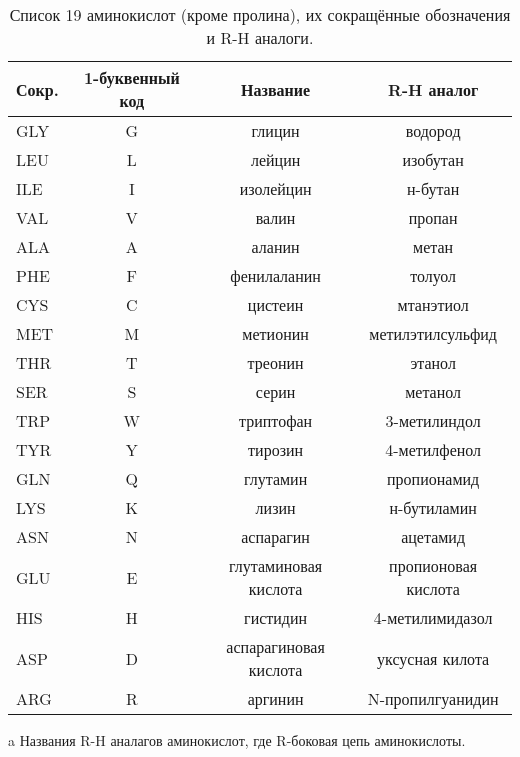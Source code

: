 \begin{table}
\caption{\label{tab:amino_codes} Список 19 аминокислот (кроме пролина), их сокращённые обозначения и R-H аналоги.}
\begin{threeparttable}
	\begin{tabular}{lccc}
Сокр. & 1-буквенный код &Название& R-H аналог\tnote{a} \\
	\hline
GLY &G&глицин& водород  				\\
LEU &L&лейцин& изобутан 				\\
ILE &I&изолейцин& н-бутан 			\\
VAL &V&валин& пропан       \\
ALA &A&аланин& метан           \\
PHE &F&фенилаланин& толуол     \\
CYS &C&цистеин& мтанэтиол      \\
MET &M&метионин& метилэтилсульфид\\
THR &T&треонин& этанол		\\
SER &S&серин& метанол		  \\
TRP &W&триптофан& 3-метилиндол \\
TYR &Y&тирозин& 4-метилфенол   \\
GLN &Q&глутамин& пропионамид    \\
LYS &K&лизин& н-бутиламин  \\
ASN &N&аспарагин& ацетамид      \\
GLU &E&глутаминовая кислота& пропионовая кислота  \\
HIS &H&гистидин& 4-метилимидазол  \\
ASP &D&аспарагиновая кислота&  уксусная килота         \\
ARG &R&аргинин& N-пропилгуанидин   


\end{tabular}
\begin{tablenotes}
\item[a]{Названия R-H аналагов аминокислот, где R-боковая цепь аминокислоты.}
\end{tablenotes}
\end{threeparttable}
\end{table}

	 